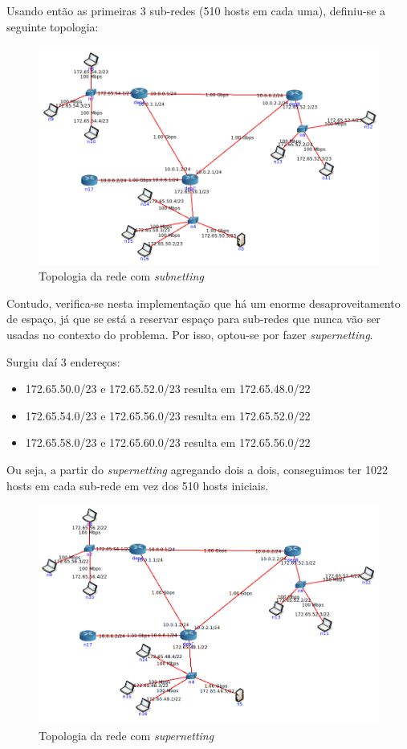\documentclass{llncs}
\begin{document}
Usando então as primeiras 3 sub-redes (510 hosts em cada uma), definiu-se a seguinte topologia:

\begin{figure}[H]
\begin{center}
\includegraphics[width=12cm]{topoFIM.PNG}
\end{center}
\caption{Topologia da rede com \textit{subnetting}}
\end{figure}

Contudo, verifica-se nesta implementação que há um enorme desaproveitamento de espaço, já que se está a reservar espaço para sub-redes que nunca vão ser usadas no contexto do problema. Por isso, optou-se por fazer \textit{supernetting}.

Surgiu daí 3 endereços:

\begin{itemize}
    \item 172.65.50.0/23 e 172.65.52.0/23 resulta em 172.65.48.0/22
    \item 172.65.54.0/23 e 172.65.56.0/23 resulta em 172.65.52.0/22
    \item 172.65.58.0/23 e 172.65.60.0/23 resulta em 172.65.56.0/22
\end{itemize}

Ou seja, a partir do \textit{supernetting} agregando dois a dois, conseguimos ter 1022 hosts em cada sub-rede em vez dos 510 hosts iniciais.

\begin{figure}[H]
\begin{center}
\includegraphics[width=12cm]{topoSuperN.PNG}
\end{center}
\caption{Topologia da rede com \textit{supernetting}}
\end{figure}
\end{document}
